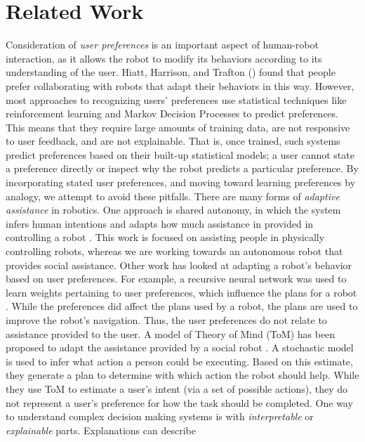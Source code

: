 \documentclass[letterpaper]{article} %
\begin{document}
\section{Related Work}
Consideration of \textit{user preferences} is an important aspect of human-robot interaction, as it allows the robot to modify its behaviors according to its understanding of the user. Hiatt, Harrison, and Trafton (\citeyear{hiatt2011accommodating}) found that people prefer collaborating with robots that adapt their behaviors in this way. However, most approaches to recognizing users' preferences use statistical techniques like reinforcement learning \cite{woodworth2018preference} and Markov Decision Processes \cite{munzer2017preference} to predict preferences. This means that they require large amounts of training data, are not responsive to user feedback, and are not explainable. That is, once trained, such systems predict preferences based on their built-up statistical models; a user cannot state a preference directly or inspect why the robot predicts a particular preference. By incorporating stated user preferences, and moving toward learning preferences by analogy, we attempt to avoid these pitfalls.  There are many forms of \textit{adaptive assistance} in robotics.  One approach is
shared autonomy, in which the system infers human intentions and adapts how
much assistance in provided in controlling a robot \cite{Nikolaidis2017,Jain2019}.
This work is focused on assisting people in physically controlling robots,
whereas we are working towards an autonomous robot that provides social assistance.  Other work has looked at adapting a robot's behavior based on user preferences.
For example, a recursive neural network was used
to learn weights pertaining to user preferences, which influence the plans for
a robot \cite{Bacciu2014}.  While the preferences did affect the plans used by a robot,
the plans are used to improve the
robot's navigation.  Thus, the user preferences do not relate to assistance
provided to the user.  A model of Theory of Mind (ToM) has been proposed to adapt the assistance provided
by a social robot \cite{Gorur2017}.  A stochastic model is used to infer what action a person could
be executing.  Based on this estimate, they generate a plan to determine with which
action the robot should help.
While they use ToM to estimate a user's intent (via a set of possible actions),
they do not represent a user's preference for how the task should be completed.  One way to understand complex decision making systems is with
\emph{interpretable} or \emph{explainable} parts.  Explanations can describe
\end{document}
